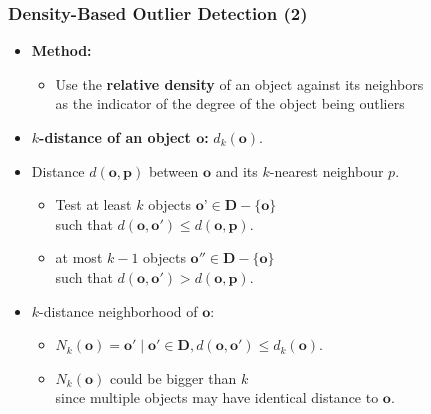 \begin{frame}
	\frametitle{Density-Based Outlier Detection (2)}
	\begin{itemize}
		\item \textbf{Method:}
		      \begin{itemize}
			      \item Use the \textbf{relative density} of an object against its neighbors \\
			            as the indicator of the degree of the object being outliers
		      \end{itemize}
		\item \textbf{{\color{airforceblue}$k$-distance} of an object $\mathbf{o}$:} $d_k(\mathbf{o})$.
		\item Distance $d(\mathbf{o}, \mathbf{p})$ between $\mathbf{o}$ and its $k$-nearest neighbour $p$.
		      \begin{itemize}
			      \item Test at least $k$ objects $\textbf{o'} \in \mathbf{D} - \{\mathbf{o}\}$ \\
			            such that $d(\mathbf{o}, \mathbf{o'}) \leq d(\mathbf{o}, \mathbf{p})$.
			      \item at most $k-1$ objects $\mathbf{o''} \in \mathbf{D} - \{\mathbf{o}\}$ \\
			            such that $d(\mathbf{o}, \mathbf{o'}) > d(\mathbf{o}, \mathbf{p})$.
		      \end{itemize}
		\item $k$-distance neighborhood of $\mathbf{o}$:
		      \begin{itemize}
			      \item $N_k(\mathbf{o}) = {\mathbf{o'} \; \vert \; \mathbf{o'} \in \mathbf{D}, d(\mathbf{o}, \mathbf{o'}) \leq d_k(\mathbf{o})}$.
			      \item $N_k(\mathbf{o})$ could be bigger than $k$ \\
			            since multiple objects may have identical distance to $\mathbf{o}$.
		      \end{itemize}
	\end{itemize}
\end{frame}


